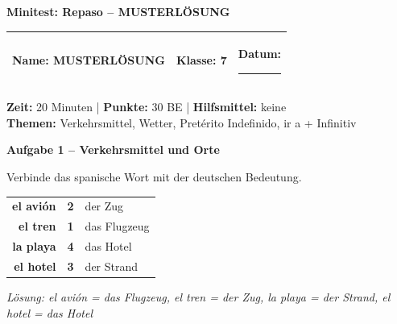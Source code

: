 \documentclass[11pt, a4paper]{article}
\newcommand{\fachfarbe}{spanisch}
\newcommand{\thema}{Minitest: Repaso -- MUSTERLÖSUNG}
\newcommand{\klasse}{7}
\newcommand{\maxpunkte}{30}
\newcommand{\zeit}{20 Minuten}
\newcommand{\punktebox}[1]{\hfill\fbox{\small \_/#1}}
\newcommand{\luecke}[1]{\rule{#1}{0.4pt}}
\newcommand{\lsg}[1]{\textcolor{loesung}{\textbf{#1}}}
\newenvironment{aufgabe}[1]{%
    \needspace{5\baselineskip}%
    \nopagebreak[4]%
    \vspace{10pt}
    \noindent\textbf{\textcolor{\fachfarbe}{Aufgabe #1}}
    \nopagebreak[4]%
    \vspace{5pt}
    \nopagebreak[4]%
    \begin{list}{}{\leftmargin=0pt}
    \item[]
}{%
    \end{list}
}
\newcommand{\es}[1]{\textcolor{\fachfarbe}{\textbf{#1}}}
\begin{document}

\begin{center}
    {\Large\bfseries\textcolor{\fachfarbe}{\thema}}
\end{center}

\vspace{5pt}

\noindent
\begin{tabularx}{\textwidth}{|X|X|X|}
\hline
\textbf{Name:} \lsg{MUSTERLÖSUNG} &
\textbf{Klasse:} \klasse &
\textbf{Datum:} \luecke{2cm} \\
\hline
\end{tabularx}

\vspace{10pt}

\begin{infobox}
\textbf{Zeit:} \zeit{} | \textbf{Punkte:} \maxpunkte{} BE | \textbf{Hilfsmittel:} keine \\
\textbf{Themen:} Verkehrsmittel, Wetter, Pretérito Indefinido, ir a + Infinitiv
\end{infobox}

\vspace{15pt}


\begin{aufgabe}{1 -- Verkehrsmittel und Orte}
Verbinde das spanische Wort mit der deutschen Bedeutung. \punktebox{4}
\end{aufgabe}

\begin{center}
\begin{tabular}{rcl}
\es{el avión} & \lsg{2} & der Zug \\[0.8em]
\es{el tren} & \lsg{1} & das Flugzeug \\[0.8em]
\es{la playa} & \lsg{4} & das Hotel \\[0.8em]
\es{el hotel} & \lsg{3} & der Strand \\
\end{tabular}
\end{center}

\textit{Lösung: el avión = das Flugzeug, el tren = der Zug, la playa = der Strand, el hotel = das Hotel}

\vspace{15pt}
\end{document}

